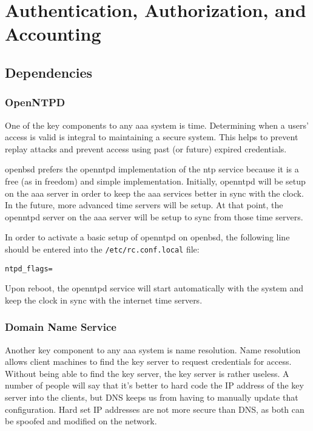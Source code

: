 \chapter{Authentication, Authorization, and Accounting}

\section{Dependencies}

\subsection{OpenNTPD}
One of the key components to any \gls{aaa} system is time.  Determining when a
users' access is valid is integral to maintaining a secure system.  This helps
to prevent replay attacks and prevent access using past (or future) expired
credentials.

\gls{openbsd} prefers the \gls{openntpd} implementation of the \gls{ntp} service
because it is a free (as in freedom) and simple implementation.  Initially,
\gls{openntpd} will be setup on the \gls{aaa} server in order to keep the
\gls{aaa} services better in sync with the clock.  In the future, more advanced
time servers will be setup.  At that point, the \gls{openntpd} server on the
\gls{aaa} server will be setup to sync from those time servers.

In order to activate a basic setup of \gls{openntpd} on \gls{openbsd}, the
following line should be entered into the \verb=/etc/rc.conf.local= file:
\begin{verbatim}
ntpd_flags=
\end{verbatim}
Upon reboot, the \gls{openntpd} service will start automatically with the system
and keep the clock in sync with the internet time servers.


\subsection{Domain Name Service}
Another key component to any \gls{aaa} system is name resolution.  Name
resolution allows client machines to find the key server to request credentials
for access.  Without being able to find the key server, the key server is rather
useless.  A number of people will say that it's better to hard code the IP
address of the key server into the clients, but DNS keeps us from having to
manually update that configuration.  Hard set IP addresses are not more secure
than DNS, as both can be spoofed and modified on the network.

